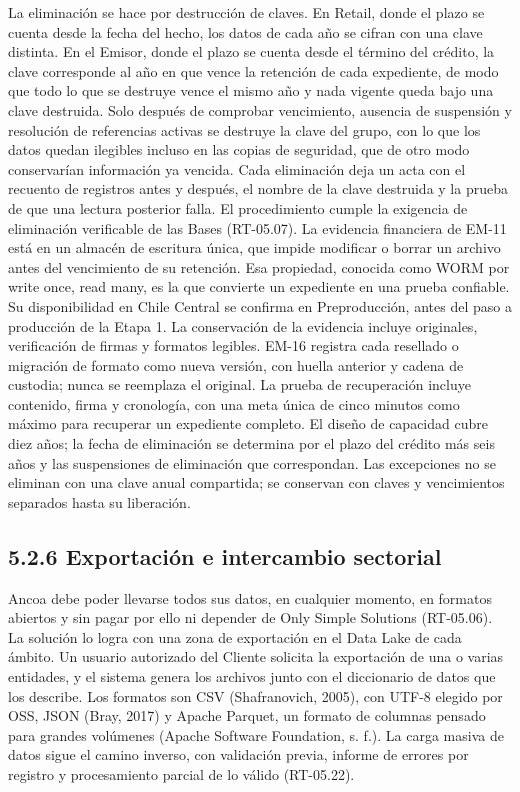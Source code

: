 \documentclass[11pt]{article}
\begin{document}
La eliminación se hace por destrucción de claves. En Retail, donde el plazo se cuenta desde la fecha del hecho, los datos de cada año se cifran con una clave distinta. En el Emisor, donde el plazo se cuenta desde el término del crédito, la clave corresponde al año en que vence la retención de cada expediente, de modo que todo lo que se destruye vence el mismo año y nada vigente queda bajo una clave destruida. Solo después de comprobar vencimiento, ausencia de suspensión y resolución de referencias activas se destruye la clave del grupo, con lo que los datos quedan ilegibles incluso en las copias de seguridad, que de otro modo conservarían información ya vencida. Cada eliminación deja un acta con el recuento de registros antes y después, el nombre de la clave destruida y la prueba de que una lectura posterior falla. El procedimiento cumple la exigencia de eliminación verificable de las Bases (RT-05.07). La evidencia financiera de EM-11 está en un almacén de escritura única, que impide modificar o borrar un archivo antes del vencimiento de su retención. Esa propiedad, conocida como WORM por write once, read many, es la que convierte un expediente en una prueba confiable. Su disponibilidad en Chile Central se confirma en Preproducción, antes del paso a producción de la Etapa 1. La conservación de la evidencia incluye originales, verificación de firmas y formatos legibles. EM-16 registra cada resellado o migración de formato como nueva versión, con huella anterior y cadena de custodia; nunca se reemplaza el original. La prueba de recuperación incluye contenido, firma y cronología, con una meta única de cinco minutos como máximo para recuperar un expediente completo. El diseño de capacidad cubre diez años; la fecha de eliminación se determina por el plazo del crédito más seis años y las suspensiones de eliminación que correspondan. Las excepciones no se eliminan con una clave anual compartida; se conservan con claves y vencimientos separados hasta su liberación.

\subsection{5.2.6 Exportación e intercambio sectorial}

Ancoa debe poder llevarse todos sus datos, en cualquier momento, en formatos abiertos y sin pagar por ello ni depender de Only Simple Solutions (RT-05.06). La solución lo logra con una zona de exportación en el Data Lake de cada ámbito. Un usuario autorizado del Cliente solicita la exportación de una o varias entidades, y el sistema genera los archivos junto con el diccionario de datos que los describe. Los formatos son CSV (Shafranovich, 2005), con UTF-8 elegido por OSS, JSON (Bray, 2017) y Apache Parquet, un formato de columnas pensado para grandes volúmenes (Apache Software Foundation, s. f.). La carga masiva de datos sigue el camino inverso, con validación previa, informe de errores por registro y procesamiento parcial de lo válido (RT-05.22).
\end{document}
